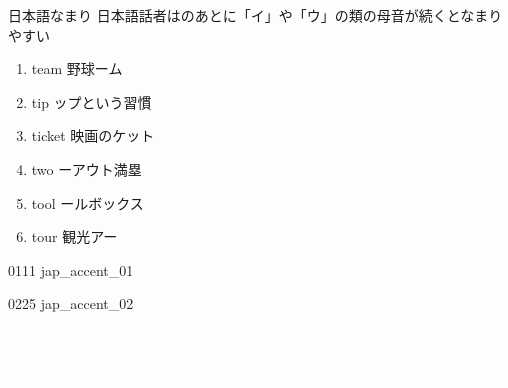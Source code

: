 \documentclass[aspectratio=169, xcolor={dvipsnames,table}]{beamer}
\begin{document}
\begin{frame}[plain]{日本語なまり}
  日本語話者はのあとに「イ」や「ウ」の類の母音が続くとなまりやすい

  \begin{enumerate}
    \item team \hfill{\scriptsize 野球ーム}

    \item tip \hfill{\scriptsize {}ップという習慣}

    \item ticket \hfill{\scriptsize 映画のケット}

    \item two \hfill{\scriptsize {}ーアウト満塁}

    \item tool \hfill{\scriptsize {}ールボックス}

    \item tour \hfill{\scriptsize 観光アー}
  \end{enumerate}
  \hfill{\tiny 0111}\,{\scriptsize {}\,{\tiny jap\_accent\_01}}

  \vspace*{-5pt}

  \hfill{\tiny 0225}\,{\scriptsize {}\,{\tiny jap\_accent\_02}}
\end{frame}
\begin{frame}
  \centering
  \textcolor{white}{\Huge\bfseries Today's Pronunciation}

  \vspace{30pt}

  \textcolor{white}{\Huge\bfseries {}, }

  \vfill

\end{frame}
\end{document}
